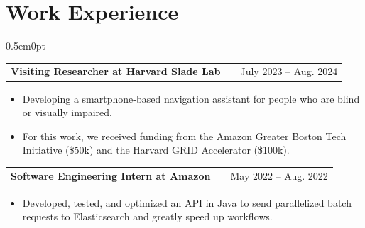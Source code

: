 \documentclass[letterpaper,11pt]{article}
\makeatletter
\newenvironment{joblong}[2]
    {
    \begin{tabularx}{\linewidth}{@{}l X r@{}}
    \textbf{#1} & \hfill &  #2 \\[3pt]
    \end{tabularx}
    \begin{minipage}[t]{\linewidth}
    \begin{itemize}[nosep,after=\strut, leftmargin=2em, itemsep=3pt,label=--]
    }
    {
    \end{itemize}
    \end{minipage}
    }
\makeatother
\begin{document}
\section{Work Experience}
\begin{adjustwidth}{0.5em}{0pt}

\begin{joblong}{Visiting Researcher at Harvard Slade Lab}{July 2023 – Aug. 2024}
\item Developing a smartphone-based navigation assistant for people who are blind or visually impaired.
\item For this work, we received funding from the Amazon Greater Boston Tech Initiative (\$50k) and the Harvard GRID Accelerator (\$100k).
\end{joblong}

\begin{joblong}{Software Engineering Intern at Amazon}{May 2022 – Aug. 2022}
\item Developed, tested, and optimized an API in Java to send parallelized batch requests to Elasticsearch and greatly speed up workflows.
\end{joblong}




\end{adjustwidth}
\end{document}
